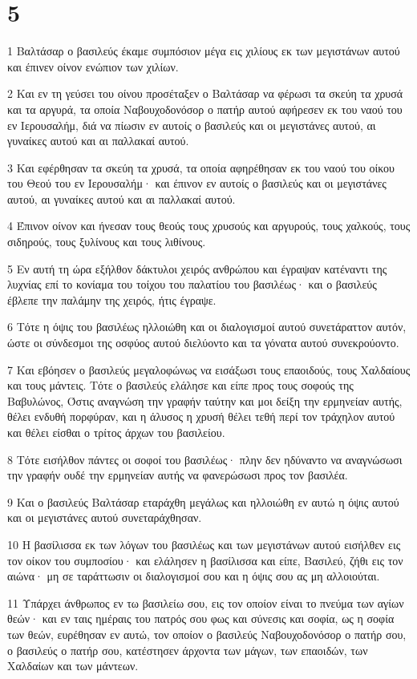 \chapter{5}

\par 1 Βαλτάσαρ ο βασιλεύς έκαμε συμπόσιον μέγα εις χιλίους εκ των μεγιστάνων αυτού και έπινεν οίνον ενώπιον των χιλίων.
\par 2 Και εν τη γεύσει του οίνου προσέταξεν ο Βαλτάσαρ να φέρωσι τα σκεύη τα χρυσά και τα αργυρά, τα οποία Ναβουχοδονόσορ ο πατήρ αυτού αφήρεσεν εκ του ναού του εν Ιερουσαλήμ, διά να πίωσιν εν αυτοίς ο βασιλεύς και οι μεγιστάνες αυτού, αι γυναίκες αυτού και αι παλλακαί αυτού.
\par 3 Και εφέρθησαν τα σκεύη τα χρυσά, τα οποία αφηρέθησαν εκ του ναού του οίκου του Θεού του εν Ιερουσαλήμ· και έπινον εν αυτοίς ο βασιλεύς και οι μεγιστάνες αυτού, αι γυναίκες αυτού και αι παλλακαί αυτού.
\par 4 Έπινον οίνον και ήνεσαν τους θεούς τους χρυσούς και αργυρούς, τους χαλκούς, τους σιδηρούς, τους ξυλίνους και τους λιθίνους.
\par 5 Εν αυτή τη ώρα εξήλθον δάκτυλοι χειρός ανθρώπου και έγραψαν κατέναντι της λυχνίας επί το κονίαμα του τοίχου του παλατίου του βασιλέως· και ο βασιλεύς έβλεπε την παλάμην της χειρός, ήτις έγραψε.
\par 6 Τότε η όψις του βασιλέως ηλλοιώθη και οι διαλογισμοί αυτού συνετάραττον αυτόν, ώστε οι σύνδεσμοι της οσφύος αυτού διελύοντο και τα γόνατα αυτού συνεκρούοντο.
\par 7 Και εβόησεν ο βασιλεύς μεγαλοφώνως να εισάξωσι τους επαοιδούς, τους Χαλδαίους και τους μάντεις. Τότε ο βασιλεύς ελάλησε και είπε προς τους σοφούς της Βαβυλώνος, Όστις αναγνώση την γραφήν ταύτην και μοι δείξη την ερμηνείαν αυτής, θέλει ενδυθή πορφύραν, και η άλυσος η χρυσή θέλει τεθή περί τον τράχηλον αυτού και θέλει είσθαι ο τρίτος άρχων του βασιλείου.
\par 8 Τότε εισήλθον πάντες οι σοφοί του βασιλέως· πλην δεν ηδύναντο να αναγνώσωσι την γραφήν ουδέ την ερμηνείαν αυτής να φανερώσωσι προς τον βασιλέα.
\par 9 Και ο βασιλεύς Βαλτάσαρ εταράχθη μεγάλως και ηλλοιώθη εν αυτώ η όψις αυτού και οι μεγιστάνες αυτού συνεταράχθησαν.
\par 10 Η βασίλισσα εκ των λόγων του βασιλέως και των μεγιστάνων αυτού εισήλθεν εις τον οίκον του συμποσίου· και ελάλησεν η βασίλισσα και είπε, Βασιλεύ, ζήθι εις τον αιώνα· μη σε ταράττωσιν οι διαλογισμοί σου και η όψις σου ας μη αλλοιούται.
\par 11 Υπάρχει άνθρωπος εν τω βασιλείω σου, εις τον οποίον είναι το πνεύμα των αγίων θεών· και εν ταις ημέραις του πατρός σου φως και σύνεσις και σοφία, ως η σοφία των θεών, ευρέθησαν εν αυτώ, τον οποίον ο βασιλεύς Ναβουχοδονόσορ ο πατήρ σου, ο βασιλεύς ο πατήρ σου, κατέστησεν άρχοντα των μάγων, των επαοιδών, των Χαλδαίων και των μάντεων.
